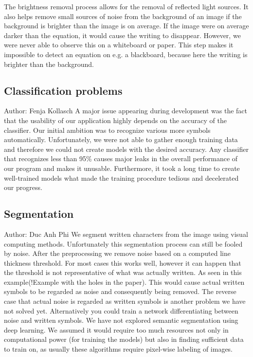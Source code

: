 \documentclass[12pt]{article}
\begin{document}
	The brightness removal process allows for the removal of reflected light sources.
	It also helps remove small sources of noise from the background of an image if the background is brighter than the image is on average.
	If the image were on average darker than the equation, it would cause the writing to disappear.
	However, we were never able to observe this on a whiteboard or paper.
	This step makes it impossible to detect an equation on e.g. a blackboard, because here the writing is brighter than the background.
	
	
	
	
	
	
	
	
	
	\subsection{Classification problems}
	\small{Author: Fenja Kollasch} \newline \newline
	A major issue appearing during development was the fact that the usability of our application highly depends on the accuracy of the classifier. Our initial ambition was to recognize various more symbols automatically. Unfortunately, we were not able to gather enough training data and therefore we could not create models with the desired accuracy. Any classifier that recognizes less than 95\% causes major leaks in the overall performance of our program and makes it unusable. Furthermore, it took a long time to create well-trained models what made the training procedure tedious and decelerated our progress.
	
	
	
	
		
	\subsection{Segmentation}
	\small{Author: Duc Anh Phi} \newline \newline
	We segment written characters from the image using visual computing methods. Unfortunately this segmentation process can still be fooled by noise. After the preprocessing we remove noise based on a computed line thickness threshold. For most cases this works well, however it can happen that the threshold is not representative of what was actually written. As seen in this example(!Example with the holes in the paper). This would cause actual written symbols to be regarded as noise and consequently being removed. The reverse case that actual noise is regarded as written symbols is another problem we have not solved yet. Alternatively you could train a network differentiating between noise and written symbols. We have not explored semantic segmentation using deep learning. We assumed it would require too much resources not only in computational power (for training the models) but also in finding sufficient data to train on, as usually these algorithms require pixel-wise labeling of images.
	
\end{document}
